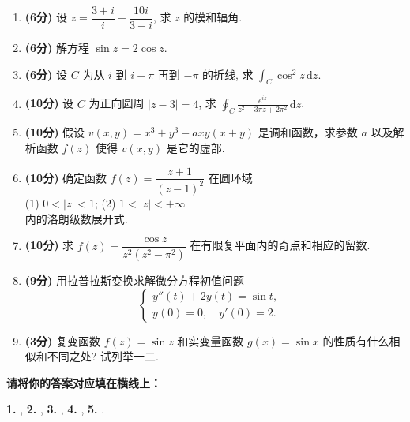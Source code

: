 \documentclass[simple]{hfutexam}
\newcommand{\diff}{\,\mathrm{d}}
\begin{document}
\begin{enumerate}
\item \textbf{(6分)} 设 $z=\dfrac{3+i}{i}-\dfrac{10i}{3-i}$, 求 $z$ 的模和辐角.
\item \textbf{(6分)} 解方程 $\sin z=2\cos z$.
\item \textbf{(6分)} 设 $C$ 为从 $i$ 到 $i-\pi$ 再到 $-\pi$ 的折线, 求 $\displaystyle\int_C\cos^2z\diff z$.
\item \textbf{(10分)} 设 $C$ 为正向圆周 $|z-3|=4$, 求 $\displaystyle\oint_C\frac{e^{iz}}{z^2-3\pi z+2\pi^2}\diff z$.
\item \textbf{(10分)} 假设 $v(x,y)=x^3+y^3-axy(x+y)$ 是调和函数，求参数 $a$ 以及解析函数 $f(z)$ 使得 $v(x,y)$ 是它的虚部.
\item \textbf{(10分)} 确定函数 $f(z)=\dfrac{z+1}{(z-1)^2}$ 在圆环域\\
\indent (1) $0<|z|<1$; \hspace{2em} (2) $1<|z|<+\infty$\\
内的洛朗级数展开式.
\item \textbf{(10分)} 求 $f(z)=\dfrac{\cos z}{z^2(z^2-\pi^2)}$ 在有限复平面内的奇点和相应的留数.
\item \textbf{(9分)} 用拉普拉斯变换求解微分方程初值问题
\[\begin{cases}
y''(t)+2y(t)=\sin t,&\\
y(0)=0,\quad y'(0)=2.
\end{cases}\]
\item \textbf{(3分)} 复变函数 $f(z)=\sin z$ 和实变量函数 $g(x)=\sin x$ 的性质有什么相似和不同之处? 试列举一二.
\end{enumerate}
\newpage


\ZhuanYeBanJi{}
\maketitle


\textbf{请将你的答案对应填在横线上：}

\textbf{1.} , 
\textbf{2.} , 
\textbf{3.} , 
\textbf{4.} , 
\textbf{5.} .
\end{document}
